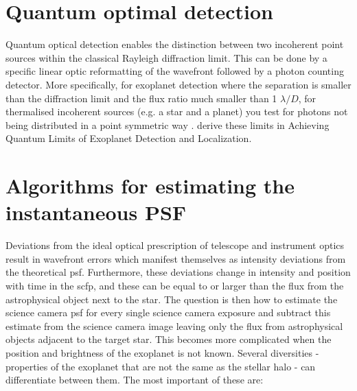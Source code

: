 \documentclass[letterpaper]{ar-1col}
\newcommand{\ld}{$\lambda/D$}
\begin{document}
%
%
 



\section{Quantum optimal detection}

Quantum optical detection \citep{Lu18} enables the distinction between two incoherent point sources within the classical Rayleigh diffraction limit.
%
This can be done by a specific linear optic reformatting of the wavefront followed by a photon counting detector.
%
More specifically, for exoplanet detection where the separation is smaller than the diffraction limit and the flux ratio much smaller than 1 \ld{}, for thermalised incoherent sources (e.g. a star and a planet) you test for photons not being distributed in a point symmetric way \citep[e.g. ][]{Huang21}.
%
\citet{Desai23} derive these limits in Achieving Quantum Limits of Exoplanet Detection and Localization.

\section{Algorithms for estimating the instantaneous PSF}


Deviations from the ideal optical prescription of telescope and instrument optics result in wavefront errors which manifest themselves as intensity deviations from the theoretical \ac{psf}.
%
Furthermore, these deviations change in intensity and position with time in the \ac{scfp}, and these can be equal to or larger than the flux from the astrophysical object next to the star.
%
The question is then how to estimate the science camera \ac{psf} for every single science camera exposure  and subtract this estimate from the science camera image leaving only the flux from astrophysical objects adjacent to the target star.
%
This becomes more complicated when the position and brightness of the exoplanet is not known.
%
%
Several diversities - properties of the exoplanet that are not the same as the stellar halo - can differentiate between them.
%
The most important of these are:
\end{document}
